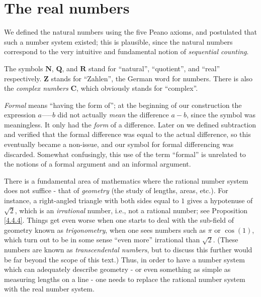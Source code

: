 \chapter{The real numbers}\label{ch 5}

\begin{note}
    We defined the natural numbers using the five Peano axioms, and postulated that such a number system existed;
    this is plausible, since the natural numbers correspond to the very intuitive and fundamental notion of \emph{sequential counting}.
\end{note}

\begin{note}
    The symbols \(\mathbf{N}\), \(\mathbf{Q}\), and \(\mathbf{R}\) stand for ``natural'', ``quotient'', and ``real'' respectively.
    \(\mathbf{Z}\) stands for ``Zahlen'', the German word for numbers.
    There is also the \emph{complex numbers} \(\mathbf{C}\), which obviously stands for ``complex''.
\end{note}

\begin{note}
    \emph{Formal} means ``having the form of'';
    at the beginning of our construction the expression \(a \text{-----} b\) did not actually \emph{mean} the difference \(a - b\), since the symbol \text{-----} was meaningless.
    It only had the \emph{form} of a difference.
    Later on we defined subtraction and verified that the formal difference was equal to the actual difference, so this eventually became a non-issue, and our symbol for formal differencing was discarded.
    Somewhat confusingly, this use of the term ``formal'' is unrelated to the notions of a formal argument and an informal argument.
\end{note}

\begin{note}
    There is a fundamental area of mathematics where the rational number system does not suffice - that of \emph{geometry}
    (the study of lengths, areas, etc.).
    For instance, a right-angled triangle with both sides equal to \(1\) gives a hypotenuse of \(\sqrt{2}\), which is an \emph{irrational} number, i.e., not a rational number;
    see Proposition \ref{4.4.4}.
    Things get even worse when one starts to deal with the sub-field of geometry known as \emph{trigonometry}, when one sees numbers such as \(\pi\) or \(\cos(1)\), which turn out to be in some sense ``even more'' irrational than \(\sqrt{2}\).
    (These numbers are known as \emph{transcendental numbers}, but to discuss this further would be far beyond the scope of this text.)
    Thus, in order to have a number system which can adequately describe geometry
    - or even something as simple as measuring lengths on a line
    - one needs to replace the rational number system with the real number system.
\end{note}

